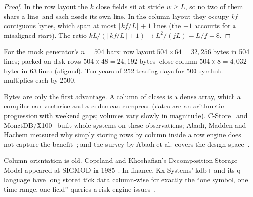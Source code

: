 \begin{proof}
In the row layout the $k$ close fields sit at stride $w\ge L$, so no two of them share a line, and each needs its own line.
In the column layout they occupy $kf$ contiguous bytes, which span at most $\lceil kf/L\rceil+1$ lines (the $+1$ accounts
for a misaligned start). The ratio $kL/(\lceil kf/L\rceil+1)\to L^2/(fL)=L/f=8$.
\end{proof}

\begin{verified}
For the mock generator's $n=504$ bars: row layout $504\times64=32{,}256$ bytes in 504 lines; packed on-disk rows
$504\times48=24{,}192$ bytes; close column $504\times8=4{,}032$ bytes in 63 lines (aligned). Ten years of 252 trading
days for 500 symbols multiplies each by 2500.
\end{verified}

Bytes are only the first advantage. A column of closes is a dense  array, which a compiler can vectorise and
a codec can compress (dates are an arithmetic progression with weekend gaps; volumes vary slowly in magnitude).
C-Store~\cite{stonebraker2005cstore} and MonetDB/X100~\cite{boncz2005x100} built whole systems on these
observations; Abadi, Madden and Hachem measured why simply storing rows by column inside a row engine does not capture
the benefit~\cite{abadi2008colrow}; and the survey by Abadi et al.\ covers the design space~\cite{abadi2013design}.

\begin{history}
Column orientation is old. Copeland and Khoshafian's Decomposition Storage Model appeared at SIGMOD in
1985~\cite{copeland1985dsm}. In finance, Kx Systems' kdb+ and its q language have long stored tick data column-wise
for exactly the ``one symbol, one time range, one field'' queries a risk engine issues~\cite{kxq}.
\end{history}

